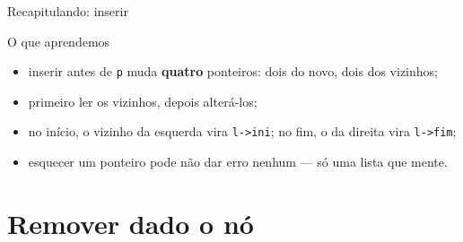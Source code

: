 \documentclass[aspectratio=169]{beamer}
\begin{document}
\begin{frame}{Recapitulando: inserir}
  \begin{block}{O que aprendemos}
    \begin{itemize}
      \item inserir antes de \texttt{p} muda \textbf{quatro} ponteiros: dois
        do novo, dois dos vizinhos;
      \item primeiro ler os vizinhos, depois alterá-los;
      \item no início, o vizinho da esquerda vira \texttt{l->ini}; no fim, o
        da direita vira \texttt{l->fim};
      \item esquecer um ponteiro pode não dar erro nenhum --- só uma lista
        que mente.
    \end{itemize}
  \end{block}
\end{frame}

\section{Remover dado o nó}
\end{document}
